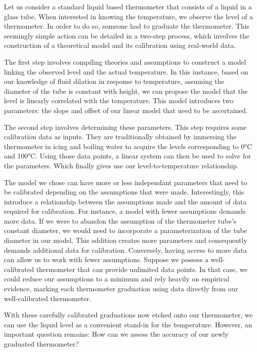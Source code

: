\begin{bibunit}
Let us consider a standard liquid based thermometer that consists of a liquid in a glass tube.
When interested in knowing the temperature, we observe the level of a thermometer.
In order to do so, someone had to graduate the thermometer. 
This seemingly simple action can be detailed in a two-step process, which involves the construction of a theoretical model and its calibration using real-world data.

The first step involves compiling theories and assumptions to construct a model linking the observed level and the actual temperature.
In this instance, based on our knowledge of fluid dilation in response to temperature, assuming the diameter of the tube is constant with height, we can propose the model that the level is linearly correlated with the temperature.
This model introduces two parameters: the slope and offset of our linear model that need to be ascertained.

The second step involves determining these parameters. This step requires some calibration data as inputs. They are traditionally obtained by immersing the thermometer in icing and boiling water to acquire the levels corresponding to 0°C and 100°C.
  Using those data points, a linear system can then be used to solve for the parameters. Which finally gives use our level-to-temperature relationship.


  The model we chose can have more or less independant parameters that need to be calibrated depending on the assumptions that were made.
  Interestingly, this introduce a relationship between the assumptions made and the amount of data required for calibration. For instance, a model with fewer assumptions demands more data. If we were to abandon the assumption of the thermometer tube's constant diameter, we would need to incorporate a parameterization of the tube diameter in our model. This addition creates more parameters and consequently demands additional data for calibration. Conversely, having access to more data can allow us to work with fewer assumptions. Suppose we possess a well-calibrated thermometer that can provide unlimited data points. In that case, we could reduce our assumptions to a minimum and rely heavily on empirical evidence, marking each thermometer graduation using data directly from our well-calibrated thermometer.

With these carefully calibrated graduations now etched onto our thermometer, we can use the liquid level as a convenient stand-in for the temperature. However, an important question remains: How can we assess the accuracy of our newly graduated thermometer?


\end{bibunit}
